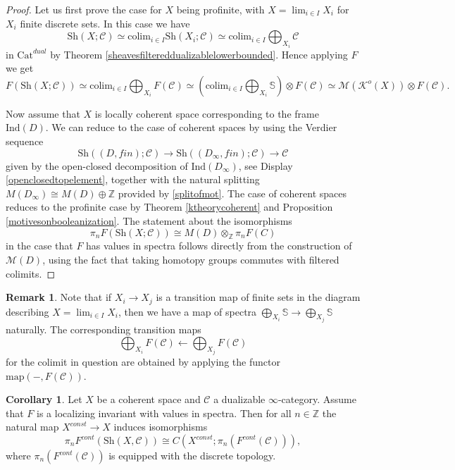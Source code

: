 \documentclass[10pt]{amsart}
\theoremstyle{definition}
\newtheorem{corollary}[theorem]{Corollary}
\newtheorem{remark}[theorem]{Remark}
\newcommand{\colim}{\text{colim}}
\begin{document}
\begin{proof} Let us first prove the case for $X$ being profinite, with $X = \lim_{i \in I} X_i$ for $X_i$ finite discrete sets. In this case we have
$$\mathrm{Sh}(X;\mathcal{C}) \simeq \colim_{i \in I} \mathrm{Sh}(X_i;\mathcal{C}) \simeq \colim_{i \in I} \bigoplus_{X_i}\mathcal{C} $$
in $\mathrm{Cat}^{dual}$ by Theorem \ref{sheavesfiltereddualizablelowerbounded}. Hence applying $F$ we get
$$F(\mathrm{Sh}(X;\mathcal{C})) \simeq \colim_{i \in I} \bigoplus_{X_i} F(\mathcal{C}) \simeq (\colim_{i \in I} \bigoplus_{X_i} \mathbb{S}) \otimes F(\mathcal{C}) \simeq \mathcal{M}(\mathcal{K}^o(X))  \otimes F(\mathcal{C}). $$

Now assume that $X$ is locally coherent space corresponding to the frame $\mathrm{Ind}(D)$. We can reduce to the case of coherent spaces by using the Verdier sequence
$$\mathrm{Sh}((D,fin);\mathcal{C}) \rightarrow \mathrm{Sh}((D_\infty,fin);\mathcal{C}) \rightarrow \mathcal{C}$$
given by the open-closed decomposition of $\mathrm{Ind}(D_\infty)$, see Display \ref{openclosedtopelement}, together with the natural splitting $M(D_{\infty}) \cong M(D) \oplus \mathbb{Z}$ provided by \ref{splitofmot}. The case of coherent spaces reduces to the profinite case by Theorem \ref{ktheorycoherent} and Proposition \ref{motivesonbooleanization}. The statement about the isomorphisms
$$\pi_n F( \mathrm{Sh}(X; \mathcal{C}) ) \cong M(D) \otimes_\mathbb{Z} \pi_n F(C)$$
in the case that $F$ has values in spectra follows directly from the construction of $\mathcal{M}(D)$, using the fact that taking homotopy groups commutes with filtered colimits.
\end{proof}

\begin{remark}
Note that if $X_i \rightarrow X_j$ is a transition map of finite sets in the diagram describing $X =  \lim_{i \in I} X_i $, then we have a map of spectra $\bigoplus_{X_i}\mathbb{S} \rightarrow \bigoplus_{X_j}\mathbb{S}$ naturally. The corresponding transition maps 
$$\bigoplus_{X_i} F(\mathcal{C}) \leftarrow \bigoplus_{X_j}F(\mathcal{C})$$
for the colimit in question are obtained by applying the functor $\mathrm{map}(-, F(\mathcal{C}))$.
\end{remark}

\begin{corollary} \label{ktheorycoherentvaluesspectra}
Let $X$ be a coherent space and $\mathcal{C}$ a dualizable $\infty$-category. Assume that $F$ is a localizing invariant with values in spectra. Then for all $n \in \mathbb{Z}$ the natural map $X^{const} \rightarrow X$ induces isomorphisms
$$ \pi_n F^{cont}( \mathrm{Sh}(X,\mathcal{C})) \cong C(X^{const}; \pi_n(F^{cont}(\mathcal{C})) ),$$
where $\pi_n(F^{cont}(\mathcal{C}))$ is equipped with the discrete topology.
\end{corollary}
\end{document}
